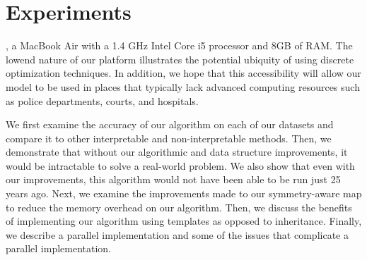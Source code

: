\chapter{Experiments}

, a MacBook Air with a 1.4 GHz Intel Core i5 processor and 8GB of RAM.
The lowend nature of our platform illustrates the potential ubiquity of using discrete optimization techniques.
In addition, we hope that this accessibility will allow our model to be used in places that typically lack advanced computing resources such as police departments, courts, and hospitals.

We first examine the accuracy of our algorithm on each of our datasets and compare it to other interpretable and non-interpretable methods.
Then, we demonstrate that without our algorithmic and data structure improvements, it would be intractable to solve a real-world problem.
We also show that even with our improvements, this algorithm would not have been able to be run just 25 years ago.
Next, we examine the improvements made to our symmetry-aware map to reduce the memory overhead on our algorithm.
Then, we discuss the benefits of implementing our algorithm using templates as opposed to inheritance.
Finally, we describe a parallel implementation and some of the issues that complicate a parallel implementation.

